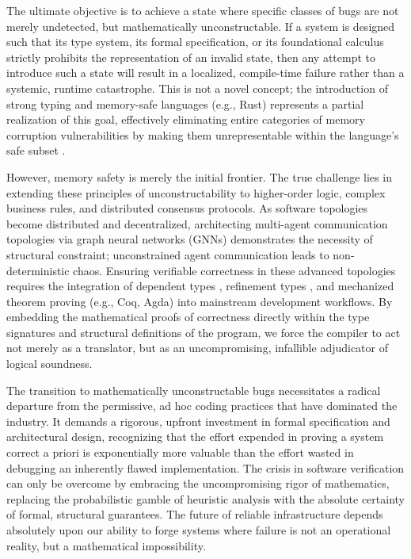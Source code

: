 The ultimate objective is to achieve a state where specific classes of bugs are not merely undetected, but mathematically unconstructable. If a system is designed such that its type system, its formal specification, or its foundational calculus strictly prohibits the representation of an invalid state, then any attempt to introduce such a state will result in a localized, compile-time failure rather than a systemic, runtime catastrophe. This is not a novel concept; the introduction of strong typing and memory-safe languages (e.g., Rust) represents a partial realization of this goal, effectively eliminating entire categories of memory corruption vulnerabilities by making them unrepresentable within the language's safe subset \cite{jung2017rustbelt}.

However, memory safety is merely the initial frontier. The true challenge lies in extending these principles of unconstructability to higher-order logic, complex business rules, and distributed consensus protocols. As software topologies become distributed and decentralized, architecting multi-agent communication topologies via graph neural networks (GNNs) \cite{ref_GDesignerArchit4} demonstrates the necessity of structural constraint; unconstrained agent communication leads to non-deterministic chaos. Ensuring verifiable correctness in these advanced topologies requires the integration of dependent types \cite{bove2009brief}, refinement types \cite{freeman1991refinement}, and mechanized theorem proving (e.g., Coq, Agda) \cite{bertot2013interactive} into mainstream development workflows. By embedding the mathematical proofs of correctness directly within the type signatures and structural definitions of the program, we force the compiler to act not merely as a translator, but as an uncompromising, infallible adjudicator of logical soundness. 

The transition to mathematically unconstructable bugs necessitates a radical departure from the permissive, ad hoc coding practices that have dominated the industry. It demands a rigorous, upfront investment in formal specification and architectural design, recognizing that the effort expended in proving a system correct a priori is exponentially more valuable than the effort wasted in debugging an inherently flawed implementation. The crisis in software verification can only be overcome by embracing the uncompromising rigor of mathematics, replacing the probabilistic gamble of heuristic analysis with the absolute certainty of formal, structural guarantees. The future of reliable infrastructure depends absolutely upon our ability to forge systems where failure is not an operational reality, but a mathematical impossibility.

